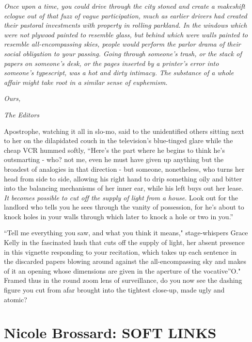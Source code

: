 \documentclass[
]{memoir}
\begin{document}
\emph{Once upon a time, you could drive through the city stoned and
create a makeshift eclogue out of that fuzz of vague participation, much
as earlier drivers had created their pastoral investments with property
in rolling parkland. In the windows which were not plywood painted to
resemble glass, but behind which were walls painted to resemble
all-encompassing skies, people would perform the parlor drama of their
social obligation to your passing. Going through someone's trash, or the
stack of papers on someone's desk, or the pages inserted by a printer's
error into someone's typescript, was a hot and dirty intimacy. The
substance of a whole affair might take root in a similar sense of
euphemism.}

\emph{Ours,}

\emph{The Editors}

Apostrophe, watching it all in slo-mo, said to the unidentified others
sitting next to her on the dilapidated couch in the television's
blue-tinged glare while the cheap VCR hummed softly, ``Here's the part
where he begins to think he's outsmarting - who? not me, even he must
have given up anything but the broadest of analogies in that direction -
but someone, nonetheless, who turns her head from side to side, allowing
his right hand to drip something oily and bitter into the balancing
mechanisms of her inner ear, while his left buys out her lease. \emph{It
becomes possible to cut off the supply of light from a house.} Look out
for the landlord who tells you he sees through the vanity of possession,
for he's about to knock holes in your walls through which later to knock
a hole or two in you.''

``Tell me everything you saw, and what you think it means,"
stage-whispers Grace Kelly in the fascinated hush that cuts off the
supply of light, her absent presence in this vignette responding to your
recitation, which takes up each sentence in the discarded papers blowing
around against the all-encompassing sky and makes of it an opening whose
dimensions are given in the aperture of the vocative''O." Framed thus in
the round zoom lens of surveillance, do you now see the dashing figure
you cut from afar brought into the tightest close-up, made ugly and
atomic?

\hypertarget{nicole-brossard-soft-links}{%
\chapter{Nicole Brossard: SOFT LINKS}\label{nicole-brossard-soft-links}}
\end{document}
